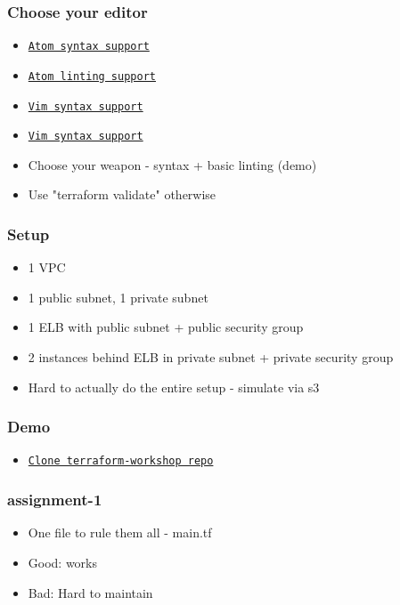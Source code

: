 \documentclass[9pt]{beamer}
\newcommand{\myblue} [1] {{\color{blue}#1}}
\begin{document}
\begin{frame}[fragile]
  \frametitle{Choose your editor}
  \begin{itemize}
    \item \myblue{\href{https://atom.io/packages/language-terraform}{\texttt{Atom syntax support}}}
    \item \myblue{\href{https://atom.io/packages/linter-terraform-syntax}{\texttt{Atom linting support}}}
    \item \myblue{\href{https://github.com/hashivim/vim-terraform}{\texttt{Vim syntax support}}}
    \item \myblue{\href{https://github.com/juliosueiras/vim-terraform-completion}{\texttt{Vim syntax support}}}
    \item Choose your weapon - syntax + basic linting (demo)
    \item Use "terraform validate" otherwise
  \end{itemize}

\end{frame}


\begin{frame}[fragile]
  \frametitle{Setup}
  \begin{itemize}
    \item 1 VPC
    \item 1 public subnet, 1 private subnet
    \item 1 ELB with public subnet + public security group
    \item 2 instances behind ELB in private subnet + private security group
    \item Hard to actually do the entire setup - simulate via s3
  \end{itemize}

\end{frame}

\begin{frame}[fragile]
  \frametitle{Demo}
  \begin{itemize}
    \item \myblue{\href{https://github.com/saurabh-hirani/terraform-workshop}{\texttt{Clone terraform-workshop repo}}}
  \end{itemize}

\end{frame}

\begin{frame}[fragile]
  \frametitle{assignment-1}

  \begin{itemize}[<+->]
    \item One file to rule them all - main.tf
    \item Good: works
    \item Bad: Hard to maintain
  \end{itemize}

\end{frame}
\end{document}
